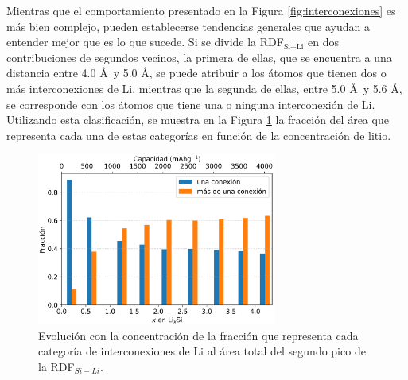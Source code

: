 Mientras que el comportamiento presentado en la Figura \ref{fig:interconexiones}
es más bien complejo, pueden establecerse tendencias generales que ayudan a 
entender mejor que es lo que sucede. Si se divide la RDF$_{\text{Si}-\text{Li}}$ en dos 
contribuciones de segundos vecinos, la primera de ellas, que se encuentra a una
distancia entre 4.0 \AA\ y 5.0 \AA, se puede atribuir a los átomos que tienen dos 
o más interconexiones de Li, mientras que la segunda de ellas, entre 5.0 \AA\ y
5.6 \AA, se corresponde con los átomos que tiene una o ninguna interconexión de 
Li. Utilizando esta clasificación, se muestra en la Figura 
\ref{fig:interconexiones-areas} la fracción del área que representa cada una de
estas categorías en función de la concentración de litio.
\begin{figure}[h!]
    \centering
    \includegraphics[width=0.7\textwidth]{Silicio/caracterizacion/resultados/interconexion/interconexiones-areas.png}
    \caption{Evolución con la concentración de la fracción que representa cada
    categoría de interconexiones de Li al área total del segundo pico de la 
    RDF$_{Si-Li}$.}
    \label{fig:interconexiones-areas}
\end{figure}
